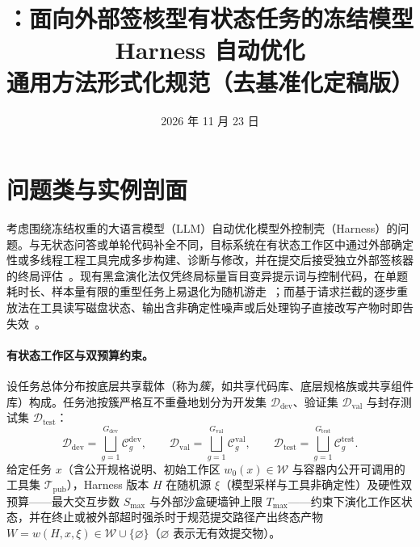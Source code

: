 \documentclass[UTF8,a4paper,10.5pt]{ctexart}
\title{\method{}：面向外部签核型有状态任务的冻结模型 Harness 自动优化\\
\large 通用方法形式化规范（去基准化定稿版）}
\author{}
\date{2026 年 11 月 23 日}
\newcommand{\Ddev}{\mathcal{D}_{\mathrm{dev}}}
\newcommand{\Dval}{\mathcal{D}_{\mathrm{val}}}
\newcommand{\Dtest}{\mathcal{D}_{\mathrm{test}}}
\begin{document}
\maketitle
\vspace{-2em}

\section{问题类与实例剖面}
\label{sec:problem}

考虑围绕冻结权重的大语言模型（LLM）自动优化模型外控制壳（Harness）的问题。与无状态问答或单轮代码补全不同，目标系统在有状态工作区中通过外部确定性或多线程工程工具完成多步构建、诊断与修改，并在提交后接受独立外部签核器的终局评估~\cite{vero,metaharness}。现有黑盒演化法仅凭终局标量盲目变异提示词与控制代码，在单题耗时长、样本量有限的重型任务上易退化为随机游走~\cite{rethinking}；而基于请求拦截的逐步重放法在工具读写磁盘状态、输出含非确定性噪声或后处理钩子直接改写产物时即告失效~\cite{chronicle}。

\paragraph{有状态工作区与双预算约束。}
设任务总体分布按底层共享载体（称为\emph{簇}，如共享代码库、底层规格族或共享组件库）构成。任务池按簇严格互不重叠地划分为开发集 $\Ddev$、验证集 $\Dval$ 与封存测试集 $\Dtest$：
\begin{equation}
  \Ddev = \bigsqcup_{g=1}^{G_{\mathrm{dev}}} \mathcal{C}^{\mathrm{dev}}_g,\qquad
  \Dval = \bigsqcup_{g=1}^{G_{\mathrm{val}}} \mathcal{C}^{\mathrm{val}}_g,\qquad
  \Dtest = \bigsqcup_{g=1}^{G_{\mathrm{test}}} \mathcal{C}^{\mathrm{test}}_g.
\end{equation}
给定任务 $x$（含公开规格说明、初始工作区 $w_0(x)\in\mathcal{W}$ 与容器内公开可调用的工具集 $\mathcal{T}_{\mathrm{pub}}$），Harness 版本 $H$ 在随机源 $\xi$（模型采样与工具非确定性）及硬性双预算——最大交互步数 $S_{\max}$ 与外部沙盒硬墙钟上限 $T_{\max}$——约束下演化工作区状态，并在终止或被外部超时强杀时于规范提交路径产出终态产物 $W = w(H,x,\xi)\in\mathcal{W}\cup\{\varnothing\}$（$\varnothing$ 表示无有效提交物）。
\end{document}
